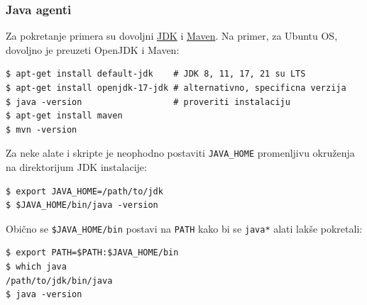 \subsubsection{Java agenti}\label{java-agenti}

Za pokretanje primera su dovoljni \href{https://www.oracle.com/java/technologies/downloads/}{JDK} i \href{https://maven.apache.org/}{Maven}. Na primer, za Ubuntu OS, dovoljno je preuzeti OpenJDK i Maven:

\begin{verbatim}
$ apt-get install default-jdk    # JDK 8, 11, 17, 21 su LTS
$ apt-get install openjdk-17-jdk # alternativno, specificna verzija
$ java -version                  # proveriti instalaciju
$ apt-get install maven
$ mvn -version
\end{verbatim}

Za neke alate i skripte je neophodno postaviti \texttt{JAVA\_HOME} promenljivu okruženja na direktorijum JDK instalacije:

\begin{verbatim}
$ export JAVA_HOME=/path/to/jdk
$ $JAVA_HOME/bin/java -version
\end{verbatim}

Obično se \texttt{\$JAVA\_HOME/bin} postavi na \texttt{PATH} kako bi se \texttt{java*} alati lakše pokretali:

\begin{verbatim}
$ export PATH=$PATH:$JAVA_HOME/bin
$ which java
/path/to/jdk/bin/java
$ java -version
\end{verbatim}
